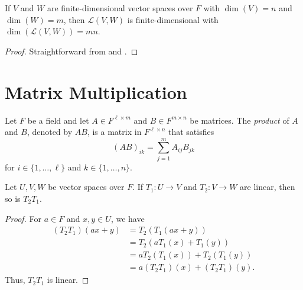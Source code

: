 \begin{corollary}
  \label{cor:matrix-representation}
  If $V$ and $W$ are finite-dimensional vector spaces over $F$ with
  $\dim(V) = n$ and $\dim(W) = m$, then $\mathcal{L}(V, W)$ is
  finite-dimensional with $\dim(\mathcal{L}(V, W)) = mn$.
\end{corollary}
\begin{proof}
  Straightforward from  and
  .
\end{proof}

\section{Matrix Multiplication}
\begin{definition}
  Let $F$ be a field and let $A \in F^{\ell \times m}$ and
  $B \in F^{m \times n}$ be matrices.
  The \emph{product} of $A$ and $B$, denoted by $AB$, is a matrix in
  $F^{\ell \times n}$ that satisfies
  \begin{equation*}
    (AB)_{ik} = \sum_{j=1}^m A_{ij}B_{jk}
  \end{equation*}
  for $i \in \{1, \dots, \ell\}$ and $k \in \{1, \dots, n\}$.
\end{definition}

\begin{proposition}
  Let $U, V, W$ be vector spaces over $F$.
  If $T_1: {U \to V}$ and $T_2: {V \to W}$ are linear, then so is $T_2T_1$.
\end{proposition}
\begin{proof}
  For $a \in F$ and $x, y \in U$, we have
  \begin{align*}
    (T_2T_1)(ax + y)
    &= T_2(T_1(ax + y)) \tag{composition of $T_1$ and $T_2$} \\
    &= T_2(aT_1(x) + T_1(y)) \tag{linearity of $T_1$} \\
    &= aT_2(T_1(x)) + T_2(T_1(y)) \tag{linearity of $T_2$} \\
    &= a(T_2T_1)(x) + (T_2T_1)(y). \tag{composition of $T_1$ and $T_2$}
  \end{align*}
  Thus, $T_2T_1$ is linear.
\end{proof}

